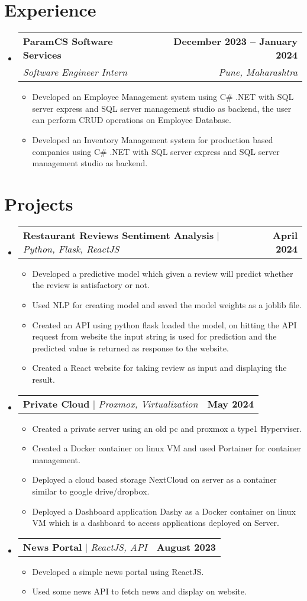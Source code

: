 \documentclass[letterpaper,11pt]{article}
\makeatletter
\newcommand{\resumeItem}[1]{
  \item\small{
    {#1 \vspace{-2pt}}
  }
}
\newcommand{\resumeSubheading}[4]{
  \vspace{-2pt}\item
    \begin{tabular*}{1.0\textwidth}[t]{l@{\extracolsep{\fill}}r}
      \textbf{#1} & \textbf{\small #2} \\
      \textit{\small#3} & \textit{\small #4} \\
    \end{tabular*}\vspace{-7pt}
}
\newcommand{\resumeProjectHeading}[2]{
    \item
    \begin{tabular*}{1.001\textwidth}{l@{\extracolsep{\fill}}r}
      \small#1 & \textbf{\small #2}\\
    \end{tabular*}\vspace{-7pt}
}
\newcommand{\resumeSubHeadingListStart}{\begin{itemize}[leftmargin=0.0in, label={}]}
\newcommand{\resumeSubHeadingListEnd}{\end{itemize}}
\newcommand{\resumeItemListStart}{\begin{itemize}}
\newcommand{\resumeItemListEnd}{\end{itemize}\vspace{-5pt}}
\makeatother
\begin{document}
\section{Experience}
  \resumeSubHeadingListStart

    \resumeSubheading
      {ParamCS Software Services}{December 2023 -- January 2024}
      {Software Engineer Intern}{Pune, Maharashtra}
      \resumeItemListStart
        \resumeItem{Developed an Employee Management system using C\# .NET with SQL server express and SQL server management studio as backend, the user can perform CRUD operations on Employee Database. }
        \resumeItem{Developed an Inventory Management system for production based companies using C\# .NET with SQL server express and SQL server management studio as backend.}
      \resumeItemListEnd
    
  \resumeSubHeadingListEnd
\vspace{-16pt}

\section{Projects}
    \vspace{-5pt}
    \resumeSubHeadingListStart
      \resumeProjectHeading
          {\textbf{Restaurant Reviews Sentiment Analysis} $|$ \emph{Python, Flask, ReactJS}}{April 2024}
          \resumeItemListStart
            \resumeItem{Developed a predictive model which given a review will predict whether the review is satisfactory or not.}
            \resumeItem{Used NLP for creating model and saved the model weights as a joblib file.}
            \resumeItem{Created an API using python flask loaded the model, on hitting the API request from website the input string is used for prediction and the predicted value is returned as response to the website.}
            \resumeItem{Created a React website for taking review as input and displaying the result.}
          \resumeItemListEnd
          \vspace{-13pt}
      \resumeProjectHeading
          {\textbf{Private Cloud} $|$ \emph{Proxmox, Virtualization}}{May 2024}
          \resumeItemListStart
            \resumeItem{Created a private server using an old pc and proxmox a type1 Hyperviser.}
            \resumeItem{Created a Docker container on linux VM and used Portainer for container management.}
            \resumeItem{Deployed a cloud based storage NextCloud on server as a container similar to google drive/dropbox.}
	    \resumeItem{Deployed a Dashboard application Dashy as a Docker container on linux VM which is a dashboard to access applications deployed on Server.}
          \resumeItemListEnd 
          \vspace{-13pt}
          \resumeProjectHeading
          {\textbf{News Portal} $|$ \emph{ReactJS, API}}{August 2023}
          \resumeItemListStart
            \resumeItem{Developed a simple news portal using ReactJS.}
            \resumeItem{Used some news API to fetch news and display on website.}
          \resumeItemListEnd 
    \resumeSubHeadingListEnd
\vspace{-15pt}
\end{document}
